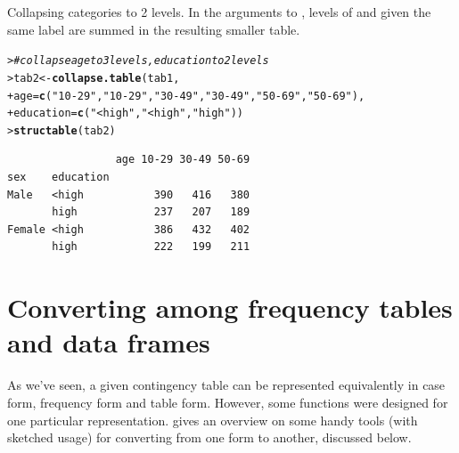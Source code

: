\documentclass[10pt,krantz2]{krantz}\usepackage[]{graphicx}\usepackage[]{color}
\makeatletter
\newcommand{\hlstr}[1]{\textcolor[rgb]{0.192,0.494,0.8}{#1}}%
\newcommand{\hlcom}[1]{\textcolor[rgb]{0.678,0.584,0.686}{\textit{#1}}}%
\newcommand{\hlstd}[1]{\textcolor[rgb]{0.345,0.345,0.345}{#1}}%
\newcommand{\hlkwb}[1]{\textcolor[rgb]{0.69,0.353,0.396}{#1}}%
\newcommand{\hlkwc}[1]{\textcolor[rgb]{0.333,0.667,0.333}{#1}}%
\newcommand{\hlkwd}[1]{\textcolor[rgb]{0.737,0.353,0.396}{\textbf{#1}}}%
\newenvironment{kframe}{%
 \def\at@end@of@kframe{}%
 \ifinner\ifhmode%
  \def\at@end@of@kframe{\end{minipage}}%
  \begin{minipage}{\columnwidth}%
 \fi\fi%
 \def\FrameCommand##1{\hskip\@totalleftmargin \hskip-\fboxsep
 \colorbox{shadecolor}{##1}\hskip-\fboxsep
     \hskip-\linewidth \hskip-\@totalleftmargin \hskip\columnwidth}%
 \MakeFramed {\advance\hsize-\width
   \@totalleftmargin\z@ \linewidth\hsize
   \@setminipage}}%
 {\par\unskip\endMakeFramed%
 \at@end@of@kframe}
\newenvironment{knitrout}{}{} %
\renewenvironment{knitrout}{\small\renewcommand{\baselinestretch}{.85}}{} %
\makeatother
\begin{document}
\begin{Example}{Collapsing categories}
to 2 levels. In the arguments to , levels of  and 
given the same label are summed in the resulting smaller table.
\begin{knitrout}
\color{fgcolor}\begin{kframe}
\begin{alltt}
\hlstd{> }\hlcom{# collapse age to 3 levels, education to 2 levels}
\hlstd{> }\hlstd{tab2} \hlkwb{<-} \hlkwd{collapse.table}\hlstd{(tab1,}
\hlstd{+ }         \hlkwc{age} \hlstd{=} \hlkwd{c}\hlstd{(}\hlstr{"10-29"}\hlstd{,} \hlstr{"10-29"}\hlstd{,}  \hlstr{"30-49"}\hlstd{,} \hlstr{"30-49"}\hlstd{,} \hlstr{"50-69"}\hlstd{,} \hlstr{"50-69"}\hlstd{),}
\hlstd{+ }         \hlkwc{education} \hlstd{=} \hlkwd{c}\hlstd{(}\hlstr{"<high"}\hlstd{,} \hlstr{"<high"}\hlstd{,} \hlstr{"high"}\hlstd{))}
\hlstd{> }\hlkwd{structable}\hlstd{(tab2)}
\end{alltt}
\begin{verbatim}
                 age 10-29 30-49 50-69
sex    education                      
Male   <high           390   416   380
       high            237   207   189
Female <high           386   432   402
       high            222   199   211
\end{verbatim}
\end{kframe}
\end{knitrout}
\end{Example}


\section{Converting among frequency tables and data frames}\label{sec:convert}

As we've seen, a given contingency table can be represented
equivalently in case form, frequency form and table form.
However, some \R functions were designed for one particular representation.
 gives an overview on some handy tools (with
sketched usage) for converting from one form to another, discussed below.
\end{document}
